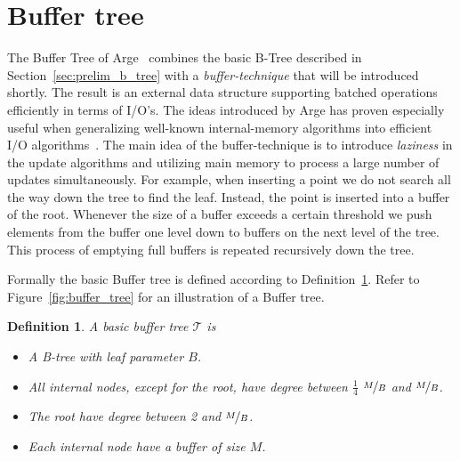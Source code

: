 \documentclass[twoside,11pt,openright]{report}
\newtheorem{definition}{Definition}
\begin{document}
\section{Buffer tree}
\label{sec:prelim_buffer_tree}
The Buffer Tree of Arge~\cite{Arge:1995:BTN:645930.672850} combines the basic B-Tree described in Section~\ref{sec:prelim_b_tree} with a \textit{buffer-technique} that will be introduced shortly. The result is an external data structure supporting batched operations efficiently in terms of I/O's. The ideas introduced by Arge has proven especially useful when generalizing well-known internal-memory algorithms into efficient I/O algorithms~\cite{Arge:1995:BTN:645930.672850}. The main idea of the buffer-technique is to introduce \textit{laziness} in the update algorithms and utilizing main memory to process a large number of updates simultaneously. For example, when inserting a point we do not search all the way down the tree to find the leaf. Instead, the point is inserted into a buffer of the root. Whenever the size of a buffer exceeds a certain threshold we push elements from the buffer one level down to buffers on the next level of the tree. This process of emptying full buffers is repeated recursively down the tree.

Formally the basic Buffer tree is defined according to Definition~\ref{def:buffer_tree}. Refer to Figure~\ref{fig:buffer_tree} for an illustration of a Buffer tree.

\begin{definition}
\label{def:buffer_tree}
A basic buffer tree $\mathcal{T}$ is
\begin{itemize}
	\item A B-tree with leaf parameter $B$.
	\item All internal nodes, except for the root, have degree between $\frac{1}{4}$ $\nicefrac{M}{B}$ and $\nicefrac{M}{B}$.
	\item The root have degree between 2 and $\nicefrac{M}{B}$.
	\item Each internal node have a buffer of size $M$.
\end{itemize}
\end{definition}
\end{document}
